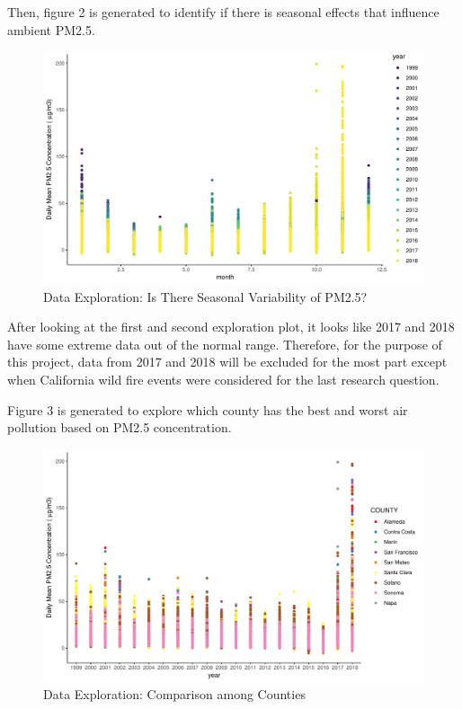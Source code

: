 \documentclass[12pt,]{article}
\begin{document}
Then, figure 2 is generated to identify if there is seasonal effects
that influence ambient PM2.5.

\begin{figure}
\centering
\includegraphics{pm25_files/figure-latex/explore2-1.pdf}
\caption{Data Exploration: Is There Seasonal Variability of PM2.5?}
\end{figure}

After looking at the first and second exploration plot, it looks like
2017 and 2018 have some extreme data out of the normal range. Therefore,
for the purpose of this project, data from 2017 and 2018 will be
excluded for the most part except when California wild fire events were
considered for the last research question.

Figure 3 is generated to explore which county has the best and worst air
pollution based on PM2.5 concentration.

\begin{figure}
\centering
\includegraphics{pm25_files/figure-latex/explore3-1.pdf}
\caption{Data Exploration: Comparison among Counties}
\end{figure}
\end{document}
